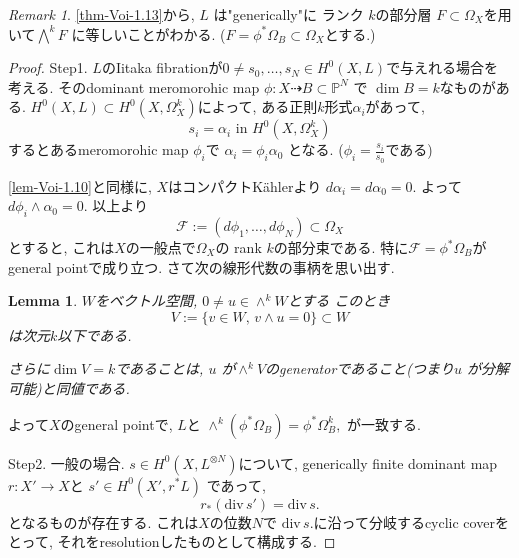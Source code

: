 \documentclass[dvipdfmx,a4paper,11pt]{article} %
\newtheorem{lem}[thm]{Lemma}
\theoremstyle{definition}
\theoremstyle{remark}
\newtheorem{rem}[thm]{Remark}
\numberwithin{equation}{section}
\begin{document}

\begin{rem}\cite[Remark 1.15]{Voi}
\ref{thm-Voi-1.13}から,  \(L\) は"generically"に
ランク \(k\)の部分層 \(F\subset  \Omega_X\)を用いて\(\bigwedge^k F\) に等しいことがわかる. ($F=\phi^*\Omega_B \subset  \Omega_X$とする.)
\end{rem}

\begin{proof}
Step1. 
$L$のIitaka fibrationが\(0 \ne s_0,\dots,s_N \in H^0 (X, L)\)で与えれる場合を考える. 
そのdominant meromorohic map \(\phi : X \dashrightarrow B \subset \mathbb{P}^{N}\) で \(\dim B = k\)なものがある. 
\(H^0(X, L) \subset H^0(X, \Omega_X^k)\)によって, ある正則$k$形式$\alpha_i$があって, 
$$
s_i = \alpha_i \text{ in } H^0(X, \Omega_X^k)
$$
するとあるmeromorohic map \(\phi_i\)で \(\alpha_i = \phi_i \alpha_0\) となる. ($\phi_i =\frac{s_i}{s_0}$である)

\ref{lem-Voi-1.10}と同様に, $X$はコンパクトK\"ahlerより \(d\alpha_i=d\alpha_0=0\). 
よって\(d\phi_i \wedge \alpha_0 = 0\). 
以上より
$$
\mathcal{F}:=(d\phi_1, \ldots, d\phi_N) \subset \Omega_{X}
$$
とすると, これは$X$の一般点で\(\Omega_X\)の rank \(k\)の部分束である. 特に\(\mathcal{F}=\phi^*\Omega_B\)がgeneral pointで成り立つ.
さて次の線形代数の事柄を思い出す.
\begin{lem}\cite[Lemma 1.16]{Voi}
 \(W\)をベクトル空間, \(0 \ne u \in \wedge^k W\)とする
このとき
\[V := \{v \in W,\, v\wedge u = 0\} \subset W\]
は次元$k$以下である. 

さらに$\dim V=k$であることは, \(u\) が\(\wedge^k V\)のgeneratorであること(つまり\(u\) が分解可能)と同値である.
\end{lem}
よって$X$のgeneral pointで, \(L\)と
\(\wedge^k(\phi^*\Omega_B) = \phi^*\Omega_B^k,\)
が一致する. 

Step2. 一般の場合. %
$s \in H^0(X, L^{\otimes N})$について, 
generically finite dominant map \(r : X' \to X\)と \(s' \in H^0(X', r^*L)\) であって, 
 \[ r_*(\mathrm{div}\,s') = \mathrm{div}\,s.\]
 となるものが存在する. 
 これは$X$の位数$N$で \(\mathrm{div}\,s.\)に沿って分岐するcyclic coverをとって, それをresolutionしたものとして構成する. 
 

\end{proof}
\end{document}
